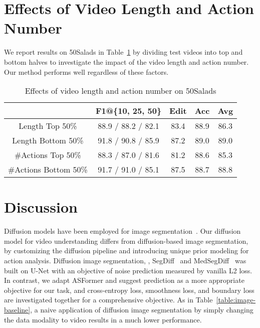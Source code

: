 \documentclass[10pt,twocolumn,letterpaper]{article}
\begin{document}
\section{Effects of Video Length and Action Number} 
We report results on 50Salads in Table~\ref{table:50-50} by dividing test videos into top and bottom halves to investigate the impact of the video length and action number. 
Our method performs well regardless of these factors.
\begin{table}[t]
\begin{center}
\footnotesize
\begin{tabular}{c | c c c c c c }
\hline
  & \multicolumn{3}{c}{F1@\{10, 25, 50\}} & Edit & Acc & Avg \\
\hline
Length Top 50\% & \multicolumn{3}{c}{ 88.9 / 88.2 / 82.1} & 83.4 & 88.9 & 86.3 \\
Length Bottom 50\% & \multicolumn{3}{c}{ 91.8 / 90.8 / 85.9} & 87.2 & 89.0 & 89.0 \\
\hline
\#Actions Top 50\% & \multicolumn{3}{c}{ 88.3 / 87.0 / 81.6} & 81.2 & 88.6 & 85.3 \\
\#Actions Bottom 50\% & \multicolumn{3}{c}{ 91.7 / 91.0 / 85.1} & 87.5 & 88.7 & 88.8 \\
\hline
\end{tabular}
\end{center}
\caption{Effects of video length and action number on 50Salads}
\label{table:50-50}
\end{table}


\section{Discussion} 

Diffusion models have been employed for image segmentation~\cite{2021_ICLR_Baranchuk,SegDiff,MedSegDiff}.
Our diffusion model for video understanding differs from diffusion-based image segmentation, by customizing the diffusion pipeline and introducing unique prior modeling for action analysis. 
Diffusion image segmentation, \eg, SegDiff~\cite{SegDiff} and MedSegDiff~\cite{MedSegDiff} was built on U-Net with an objective of noise  prediction measured by vanilla L2 loss. 
In contrast, we adapt ASFormer and suggest  prediction as a more appropriate objective for our task, and cross-entropy loss, smoothness loss, and boundary loss are investigated together for a comprehensive objective. 
As in Table~\ref{table:image-baseline}, a naive application of diffusion image segmentation by simply changing the data modality to video results in a much lower performance. 
\end{document}
